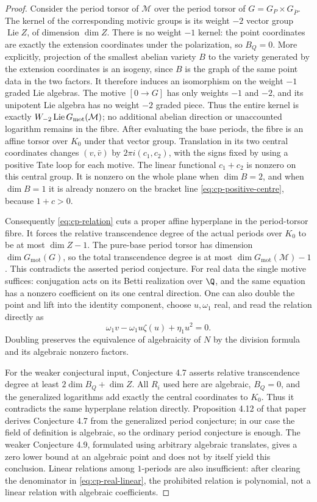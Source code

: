 \begin{proof}
Consider the period torsor of $\mathcal M$ over the period
torsor of $G=G_P\times G_{\bar P}$. The kernel of the
corresponding motivic groups is its weight $-2$ vector group
$\operatorname{Lie}Z$, of dimension $\dim Z$. There is no
weight $-1$ kernel: the point coordinates are exactly the
extension coordinates under the polarization, so $B_Q=0$.
More explicitly, projection of the smallest abelian variety $B$
to the variety generated by the extension coordinates is an
isogeny, since $B$ is the graph of the same point data in the
two factors. It therefore induces an isomorphism on the
weight $-1$ graded Lie algebras. The motive $[0\to G]$ has
only weights $-1$ and $-2$, and its unipotent Lie algebra has
no weight $-2$ graded piece. Thus the entire kernel is exactly
$W_{-2}\operatorname{Lie}G_{\rm mot}(\mathcal M)$; no additional
abelian direction or unaccounted logarithm remains in the fibre.
After evaluating the base periods, the fibre is an affine
torsor over $K_0$ under that vector group. Translation in
its two central coordinates changes $(v,\bar v)$ by
$2\pi i(c_1,c_2)$, with the signs fixed by using a positive
Tate loop for each motive. The linear functional
$c_1+c_2$ is nonzero on this central group. It is nonzero
on the whole plane when $\dim B=2$, and when $\dim B=1$
it is already nonzero on the bracket line
\eqref{eq:cp-positive-centre}, because $1+c>0$.

Consequently \eqref{eq:cp-relation} cuts a proper affine
hyperplane in the period-torsor fibre. It forces the relative
transcendence degree of the actual periods over $K_0$ to be
at most $\dim Z-1$. The pure-base period torsor has dimension
$\dim G_{\mathrm{mot}}(G)$, so the total transcendence degree
is at most $\dim G_{\mathrm{mot}}(\mathcal M)-1$.
This contradicts the asserted period conjecture. For real
data the single motive suffices: conjugation acts on its
Betti realization over $\Q$, and the same equation has a
nonzero coefficient on its one central direction. One can
also double the point and lift into the identity component,
choose $u,\omega_1$ real, and read the relation directly as
\[
 \omega_1 v-\omega_1u\zeta(u)+\eta_1u^2=0.
\]
Doubling preserves the equivalence of algebraicity of $N$
by the division formula and its algebraic nonzero factors.

For the weaker conjectural input, Conjecture 4.7 asserts
relative transcendence degree at least $2\dim B_Q+\dim Z$.
All $R_i$ used here are algebraic, $B_Q=0$, and the
generalized logarithms add exactly the central coordinates
to $K_0$. Thus it contradicts the same hyperplane relation
directly. Proposition 4.12 of that paper derives Conjecture
4.7 from the generalized period conjecture; in our case the
field of definition is algebraic, so the ordinary period
conjecture is enough. The weaker Conjecture 4.9, formulated
using arbitrary algebraic translates, gives a zero lower
bound at an algebraic point and does not by itself yield
this conclusion. Linear relations among $1$-periods are
also insufficient: after clearing the denominator in
\eqref{eq:cp-real-linear}, the prohibited relation is
polynomial, not a linear relation with algebraic coefficients.
\end{proof}
